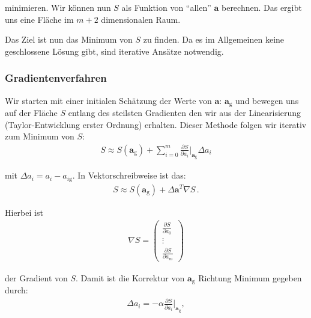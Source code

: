 minimieren. Wir k\"onnen nun $S$ als Funktion von ``allen'' $\boldsymbol{a}$ berechnen. Das ergibt uns eine Fl\"ache im $m + 2$ dimensionalen Raum.


\begin{center}
\begin{tcolorbox}[enhanced,width=6in,drop fuzzy shadow southwest,
    colframe=red!50!black,colback=red!05]
   Das Ziel ist nun das Minimum von $S$ zu finden. Da es im Allgemeinen keine geschlossene L\"osung gibt, sind iterative Ans\"atze notwendig.
\end{tcolorbox}
\end{center}


\subsubsection{Gradientenverfahren}
\label{subsubsec:vl9-1}

Wir starten mit einer initialen Sch\"atzung der Werte von $\boldsymbol{a}$: $\boldsymbol{a}_\mathrm{g}$ und bewegen uns auf der Fl\"ache $S$ entlang des steilsten Gradienten den wir aus der Linearisierung (Taylor-Entwicklung erster Ordnung) erhalten. Dieser Methode folgen wir iterativ zum Minimum von $S$:
\begin{align}
S \approx S(\boldsymbol{a}_\mathrm{g}) + \sum_{i=0}^m \frac{ \partial S }{ \partial a_i } \bigg|_{\boldsymbol{a}_\mathrm{g}} \Delta a_i
\label{eq:vl9-2}
\end{align}

mit $\Delta a_i = a_i - a_{i\mathrm{g}}$. In Vektorschreibweise ist das:
\begin{align}
S \approx S(\boldsymbol{a}_\mathrm{g}) + \Delta \boldsymbol{a}^T \nabla S\,.
\label{eq:vl9-3}
\end{align}

Hierbei ist
\begin{align}
\nabla S =
\begin{pmatrix}
\frac{\partial S}{\partial a_0} \\
\vdots \\
\frac{\partial S}{\partial a_m}
\end{pmatrix}
\label{eq:vl9-4}
\end{align}

der Gradient von $S$. Damit ist die Korrektur von $\boldsymbol{a}_\mathrm{g}$ Richtung Minimum gegeben durch:
\begin{align}
\Delta a_i = - \alpha \frac{ \partial S }{ \partial a_i } \bigg|_{\boldsymbol{a}_\mathrm{g}},
\label{eq:vl9-5}
\end{align}

